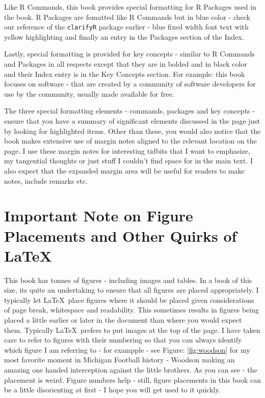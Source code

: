 Like R Commands, this book provides special formatting for R Packages used in the book. R Packages are fomatted like R Commands but in blue color - check our reference of the \texttt{clarifyR} package earlier - blue fixed width font text with yellow highlighting  and finally an entry in the Packages section of the Index. 

Lastly, special formatting is provided for key concepts - similar to R Commands and Packages in all respects except that they are in bolded and in black color and their Index entry is in the Key Concepts section. For example: this book focuses on  software - that are created by a community of software developers for use by the community, usually made available for free. 

The three special formatting elements - commands, packages and key concepts - ensure that you have a summary of significant elements discussed in the page just by looking for highlighted items. Other than these, you would also notice that the book makes extensive use of margin notes aligned to the relevant location on the page. I use these margin notes for interesting tidbits that I want to emphasize, my tangential thoughts or just stuff I couldn't find space for in the main text. I also expect that the expanded margin area will be useful for readers to make notes, include remarks etc. 

\section*{Important Note on Figure Placements and Other Quirks of \LaTeX}

This book has tonnes of figures - including images and tables. In a book of this size, its quite an undertaking to ensure that all figures are placed appropriately. I typically let \LaTeX\ place figures where it should be placed given considerations of page break, whitespace and readability. This sometimes results in figures being placed a little earlier or later in the document than where you would expect them. Typically \LaTeX\ prefers to put images at the top of the page. I have taken care to refer to figures with their numbering so that you can always identify which figure I am referring to - for exampple - see Figure: \ref{fig:woodson} for my most favorite moment in Michigan Football history - Woodson making an amazing one handed interception against the little brothers. As you can see - the placement is weird. Figure numbers help - still, figure placements in this book can be a little disorienting at first - I hope you will get used to it quickly.

